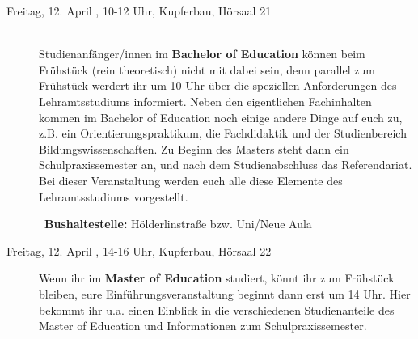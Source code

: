 \begin{description}
\iflehramt
\item[Freitag, 12. April \YEAR, 10-12 Uhr, Kupferbau, Hörsaal 21]\ \\
Studienanfänger/innen im \textbf{Bachelor of Education} können beim Frühstück (rein theoretisch) nicht mit dabei sein, 
denn parallel zum Frühstück werdert ihr um 10 Uhr über die speziellen
Anforderungen des Lehramtsstudiums informiert. Neben den eigentlichen Fachinhalten kommen im
Bachelor of Education noch einige andere Dinge auf euch zu, z.B. ein Orientierungspraktikum, die
Fachdidaktik und der Studienbereich Bildungswissenschaften. Zu Beginn des Masters steht dann
ein Schulpraxissemester an, und nach dem Studienabschluss das Referendariat. Bei dieser Veranstaltung werden euch
alle diese Elemente des Lehramtsstudiums vorgestellt.

~\textbf{Bushaltestelle:} Hölderlinstraße bzw. Uni/Neue Aula

\item[Freitag, 12. April \YEAR, 14-16 Uhr, Kupferbau, Hörsaal 22]
Wenn ihr im \textbf{Master of Education} studiert, könnt ihr zum Frühstück bleiben, eure Einführungsveranstaltung beginnt dann erst um 14 Uhr. 
Hier bekommt ihr u.a. einen Einblick in die verschiedenen Studienanteile des Master of Education und Informationen zum Schulpraxissemester.
\fi



\end{description}
